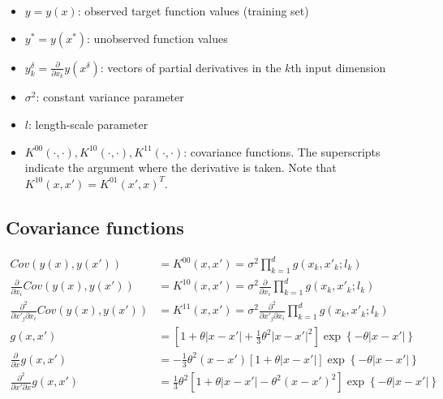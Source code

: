 \documentclass[12pt]{amsart}
\begin{document}
    \begin{itemize}
        \item $y = y(x)$: observed target function values (training set) 
        \item $y^* = y(x^*)$: unobserved function values
        \item $y_k^\delta = \frac{\partial }{{\partial {x_k}}}y\left( {{x^\delta }} \right)$: vectors of partial derivatives in the $k$th input dimension
        \item $\sigma^2$: constant variance parameter
        \item $l$: length-scale parameter
        \item $K^{00}(\cdot, \cdot), K^{10}(\cdot, \cdot), K^{11}(\cdot, \cdot)$: covariance functions. The superscripts indicate the argument where the derivative is taken. Note that ${K^{10}}\left( {x,x'} \right) = {K^{01}}{\left( {x',x} \right)^T}$.

    \end{itemize}

\bigskip
\subsection{Covariance functions}
  \begin{align}
Cov\left( {y\left( x \right),y\left( {x'} \right)} \right) &= {K^{00}}\left( {x,x'} \right) = {\sigma ^2}\prod\limits_{k = 1}^d {g\left( {{x_k},x{'_k};{l_k}} \right)} \\
\frac{\partial }{{\partial {x_i}}}Cov\left( {y\left( x \right),y\left( {x'} \right)} \right) &= {K^{10}}\left( {x,x'} \right) = {\sigma ^2}\frac{\partial }{{\partial {x_i}}}\prod\limits_{k = 1}^d {g\left( {{x_k},x{'_k};{l_k}} \right)} \\
\frac{{{\partial ^2}}}{{\partial x{'_j}\partial {x_i}}}Cov\left( {y\left( x \right),y\left( {x'} \right)} \right) &= {K^{11}}\left( {x,x'} \right) = {\sigma ^2}\frac{{{\partial ^2}}}{{\partial x{'_j}\partial {x_i}}}\prod\limits_{k = 1}^d {g\left( {{x_k},x{'_k};{l_k}} \right)} \\
g\left( {x,x'} \right) &= \left[ {1 + \theta \left| {x - x'} \right| + \frac{1}{3}{\theta ^2}{{\left| {x - x'} \right|}^2}} \right]\exp \left\{ { - \theta \left| {x - x'} \right|} \right\}\\
\frac{\partial }{{\partial x}}g\left( {x,x'} \right) &=  - \frac{1}{3}{\theta ^2}\left( {x - x'} \right)\left[ {1 + \theta \left| {x - x'} \right|} \right]\exp \left\{ { - \theta \left| {x - x'} \right|} \right\}\\
\frac{{{\partial ^2}}}{{\partial x'\partial x}}g\left( {x,x'} \right) &= \frac{1}{3}{\theta ^2}\left[ {1 + \theta \left| {x - x'} \right| - {\theta ^2}{{\left( {x - x'} \right)}^2}} \right]\exp \left\{ { - \theta \left| {x - x'} \right|} \right\}
  \end{align}
\end{document}
